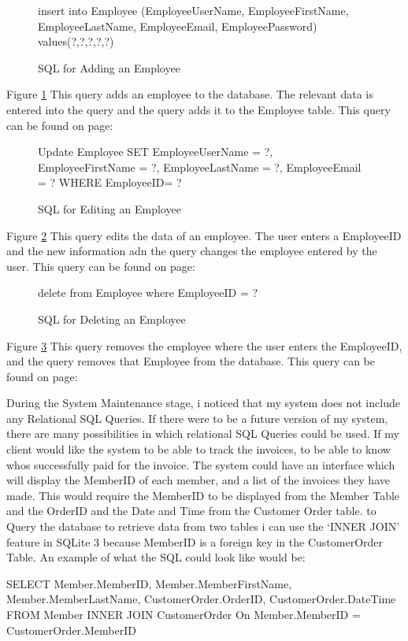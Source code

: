 \begin{figure}[H]
	 \caption{SQL for Adding an Employee} \label{fig:add-employee-sql}
\begin{sql}
insert into Employee (EmployeeUserName, EmployeeFirstName, EmployeeLastName, EmployeeEmail, EmployeePassword) values(?,?,?,?,?) 
\end{sql}
\end{figure}
Figure \ref{fig:add-employee-sql} This query adds an employee to the database. The relevant data is entered into the query and the query adds it to the Employee table. This query can be found on page:

\begin{figure}[H]
	 \caption{SQL for Editing an Employee} \label{fig:edit-employee-sql}
\begin{sql}
Update Employee SET EmployeeUserName = ?,
                                     EmployeeFirstName = ?,
                                     EmployeeLastName = ?,
                                     EmployeeEmail = ?
                                     WHERE EmployeeID= ?
                                     \end{sql}
\end{figure}
Figure \ref{fig:edit-employee-sql} This query edits the data of an employee. The user enters a EmployeeID and the new information adn the query changes the employee entered by the user. This query can be found on page: 

\begin{figure}[H]
	 \caption{SQL for Deleting an Employee} \label{fig:delete-employee-sql}
\begin{sql}
 delete from Employee where EmployeeID = ?
  \end{sql}
\end{figure}

Figure \ref{fig:delete-employee-sql} This query removes the employee where the user enters the EmployeeID, and the query removes that Employee from the database. This query can be found on page: 

During the System Maintenance stage, i noticed that my system does not include any Relational SQL Queries. If there were to be a future version of my system, there are many possibilities in which relational SQL Queries could be used. If my client would like the system to be able to track the invoices, to be able to know whos successfully paid for the invoice. The system could have an interface which will display the MemberID of each member, and a list of the invoices they have made. This would require the MemberID to be displayed from the Member Table and the OrderID and the Date and Time from the Customer Order table. to Query the database to retrieve data from two tables i can use the `INNER JOIN' feature in SQLite 3 because MemberID is a foreign key in the CustomerOrder Table. An example of what the SQL could look like would be:
\begin{sql}
SELECT Member.MemberID, Member.MemberFirstName, Member.MemberLastName, CustomerOrder.OrderID, CustomerOrder.DateTime
FROM Member
INNER JOIN CustomerOrder
On Member.MemberID = CustomerOrder.MemberID
\end{sql}

